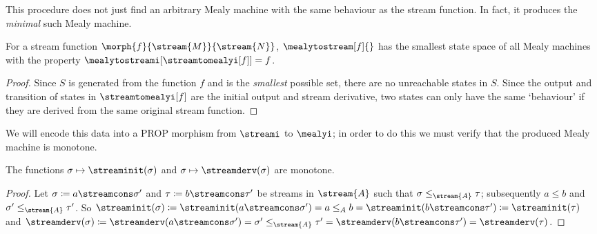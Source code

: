 \documentclass{lmcs}
\begin{document}
This procedure does not just find an arbitrary Mealy machine with the same
behaviour as the stream function.
In fact, it produces the \emph{minimal} such Mealy machine.

\begin{cor}\label{cor:minimal-mealy}
    For a stream function \(\morph{f}{\stream{M}}{\stream{N}}\),
    \(\mealytostream[f]{}\) has the smallest state space of all Mealy machines
    with the property \(
    \mealytostreami[\streamtomealyi[f]] = f
    \).
\end{cor}
\begin{proof}
    Since \(S\) is generated from the function \(f\) and is the \emph{smallest}
    possible set, there are no unreachable states in \(S\).
    Since the output and transition of states in
    \(\streamtomealyi[f]\) are the initial output and stream derivative, two
    states can only have the same `behaviour' if they are derived from the same
    original stream function.
\end{proof}

We will encode this data into a PROP morphism from \(\streami\) to \(\mealyi\);
in order to do this we must verify that the produced Mealy machine is monotone.

\begin{lem}\label{lem:head-tail-monotone}
    The functions \(\sigma \mapsto \streaminit(\sigma)\) and
    \(\sigma \mapsto \streamderv(\sigma)\) are monotone.
\end{lem}
\begin{proof}
    Let \(\sigma \coloneqq a \streamcons \sigma^\prime\) and
    \(\tau \coloneqq b \streamcons \tau^\prime\) be streams in \(\stream{A}\)
    such that \(\sigma \leq_{\stream{A}} \tau\); subsequently \(a \leq b\) and
    \(\sigma^\prime \leq_{\stream{A}} \tau^\prime\).
    So \(
    \streaminit(\sigma) \coloneqq
    \streaminit(a \streamcons \sigma^\prime) =
    a \leq_{A}
    b =
    \streaminit(b \streamcons \tau^\prime) \coloneqq
    \streaminit(\tau)
    \) and \(
    \streamderv(\sigma) \coloneqq
    \streamderv(a \streamcons \sigma^\prime) =
    \sigma^\prime \leq_{\stream{A}}
    \tau^\prime =
    \streamderv(b \streamcons \tau^\prime) =
    \streamderv(\tau)
    \).
\end{proof}
\end{document}
